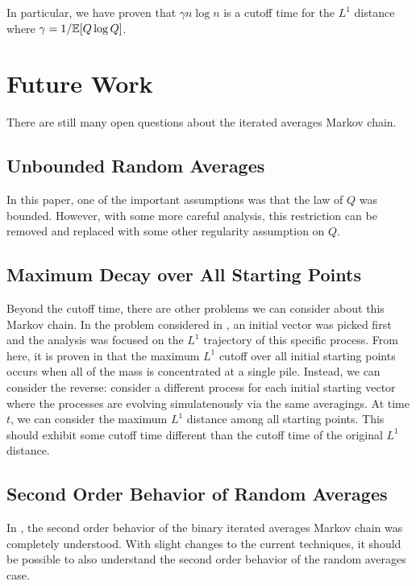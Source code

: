 \documentclass[12pt]{article}
\begin{document}
In particular, we have proven that $\gamma n \log n$ is a cutoff time for the $L^1$ distance where $\gamma = 1/\mathbb{E}[Q \log Q]$.

\section{Future Work} 

There are still many open questions about the iterated averages Markov chain. 

\subsection{Unbounded Random Averages}

In this paper, one of the important assumptions was that the law of $Q$ was bounded. However, with some more careful analysis, this restriction can be removed and replaced with some other regularity assumption on $Q$. 

\subsection{Maximum Decay over All Starting Points}
Beyond the cutoff time, there are other problems we can consider about this Markov chain. In the problem considered in \cite{chatterjee2021phase}, an initial vector was picked first and the analysis was focused on the $L^1$ trajectory of this specific process. From here, it is proven in \cite{chatterjee2021phase} that the maximum $L^1$ cutoff over all initial starting points occurs when all of the mass is concentrated at a single pile. Instead, we can consider the reverse: consider a different process for each initial starting vector where the processes are evolving simulatenously via the same averagings. At time $t$, we can consider the maximum $L^1$ distance among all starting points. This should exhibit some cutoff time different than the cutoff time of the original $L^1$ distance.

\subsection{Second Order Behavior of Random Averages}

In \cite{chatterjee2021phase}, the second order behavior of the binary iterated averages Markov chain was completely understood. With slight changes to the current techniques, it should be possible to also understand the second order behavior of the random averages case. 
\end{document}
